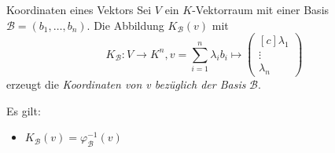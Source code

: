 \documentclass[german]{../spicker}
\newcommand{\vektor}[1]{\begin{pmatrix*}[c] #1 \end{pmatrix*}}
\begin{document}
\begin{defi}{Koordinaten eines Vektors}
    Sei $V$ ein $K$-Vektorraum mit einer Basis $\mathcal{B} = (b_1, \ldots, b_n)$.
    Die Abbildung $K_{\mathcal{B}}(v)$ mit
    $$
        K_{\mathcal{B}} : V \to K^n , v = \sum^n_{i=1} \lambda_ib_i \longmapsto \vektor{\lambda_1 \\ \vdots \\ \lambda_n}
    $$
    erzeugt die \emph{Koordinaten von v bezüglich der Basis} $\mathcal{B}$.

    Es gilt:
    \begin{itemize}
        \item $K_{\mathcal{B}}(v) = \varphi^{-1}_{\mathcal{B}}(v)$
    \end{itemize}
\end{defi}
\end{document}
